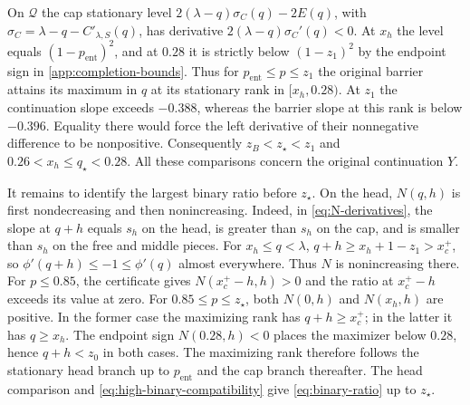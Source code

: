 \documentclass[11pt]{article}
\numberwithin{equation}{section}
\theoremstyle{plain}
\theoremstyle{definition}
\newcommand{\1}{\mathbf{1}}
\newcommand{\calQ}{\mathcal{Q}}
\begin{document}
On $\calQ$ the cap stationary level
$2(\lambda-q)\sigma_C(q)-2E(q)$, with $\sigma_C=\lambda-q-C'_{\lambda,S}(q)$, has derivative $2(\lambda-q)\sigma_C'(q)<0$. At $x_h$ the level equals $(1-p_{\mathrm{ent}})^2$, and at $0.28$ it is strictly below $(1-z_1)^2$ by the endpoint sign in \cref{app:completion-bounds}. Thus for $p_{\mathrm{ent}}\le p\le z_1$ the original barrier attains its maximum in $q$ at its stationary rank in $[x_h,0.28)$. At $z_1$ the continuation slope exceeds $-0.388$, whereas the barrier slope at this rank is below $-0.396$. Equality there would force the left derivative of their nonnegative difference to be nonpositive. Consequently $z_B<z_\star<z_1$ and $0.26<x_h\le q_\star<0.28$. All these comparisons concern the original continuation $Y$.

It remains to identify the largest binary ratio before $z_\star$. On the head, $N(q,h)$ is first nondecreasing and then nonincreasing. Indeed, in \cref{eq:N-derivatives}, the slope at $q+h$ equals $s_h$ on the head, is greater than $s_h$ on the cap, and is smaller than $s_h$ on the free and middle pieces. For $x_h\le q<\lambda$, $q+h\ge x_h+1-z_1>x_c^+$, so $\phi'(q+h)\le-1\le\phi'(q)$ almost everywhere. Thus $N$ is nonincreasing there. For $p\le0.85$, the certificate gives $N(x_c^+-h,h)>0$ and the ratio at $x_c^+-h$ exceeds its value at zero. For $0.85\le p\le z_\star$, both $N(0,h)$ and $N(x_h,h)$ are positive. In the former case the maximizing rank has $q+h\ge x_c^+$; in the latter it has $q\ge x_h$. The endpoint sign $N(0.28,h)<0$ places the maximizer below $0.28$, hence $q+h<z_0$ in both cases. The maximizing rank therefore follows the stationary head branch up to $p_{\mathrm{ent}}$ and the cap branch thereafter. The head comparison and \cref{eq:high-binary-compatibility} give \cref{eq:binary-ratio} up to $z_\star$.
\end{document}
